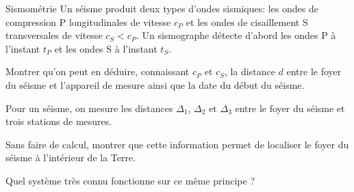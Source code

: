 \begin{exo}[PCSI]{Sismométrie}
Un séisme produit deux types d'ondes sismiques: les ondes de compression P longitudinales de vitesse $c_P$ et les ondes de cisaillement S transversales de vitesse $c_S<c_P$. Un sismographe détecte d'abord les ondes P à l'instant $t_P$ et les ondes S à l'instant $t_S$.
\begin{quest}
\item Montrer qu'on peut en déduire, connaissant $c_P$ et $c_S$, la distance $d$ entre le foyer du séisme et l'appareil de mesure ainsi que la date du début du séisme.

\item Pour un séisme, on mesure les distances $\Delta_1$, $\Delta_2$ et $\Delta_3$ entre le foyer du séisme et trois stations de mesures.

Sans faire de calcul, montrer que cette information permet de localiser le foyer du séisme à l'intérieur de la Terre.

Quel système très connu fonctionne sur ce même principe ?

\end{quest}
\end{exo}


